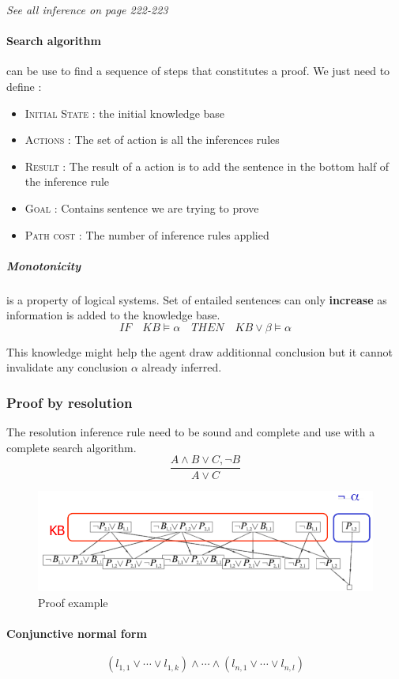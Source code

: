 \textit{See all inference on page 222-223}

\paragraph{Search algorithm} can be use to find a sequence of steps that constitutes a proof.
We just need to define : 
\begin{itemize}
    \item \textsc{Initial State} : the initial knowledge base
    \item \textsc{Actions} : The set of action is all the inferences rules
    \item \textsc{Result} : The result of a action is to add the sentence in the bottom half of the inference 
    rule
    \item \textsc{Goal} : Contains sentence we are trying to prove
    \item \textsc{Path cost} : The number of inference rules applied
\end{itemize}

\subparagraph{\textbf{Monotonicity}} is a property of logical systems. 
Set of entailed sentences can only \textbf{increase} as information is
added to the knowledge base.
$$ IF \quad KB \models \alpha \quad THEN \quad KB \vee \beta \models \alpha$$

This knowledge might  help the agent draw additionnal  conclusion but it
cannot invalidate any conclusion $\alpha$ already inferred.


\subsubsection{Proof by resolution}
The resolution inference rule need to be sound and complete and use with a 
complete search algorithm.
$$ \frac{A \wedge B \vee C, \neg B}{A \vee C}$$

\begin{figure}[h]
    \centering
    \includegraphics[width=12cm]{proof.png}
    \caption{Proof example}
\end{figure}

\paragraph{Conjunctive normal form} 
$$(l_{1,1} \vee \cdots \vee l_{1,k}) \wedge \cdots \wedge (l_{n,1} \vee \cdots \vee l_{n,l})$$


